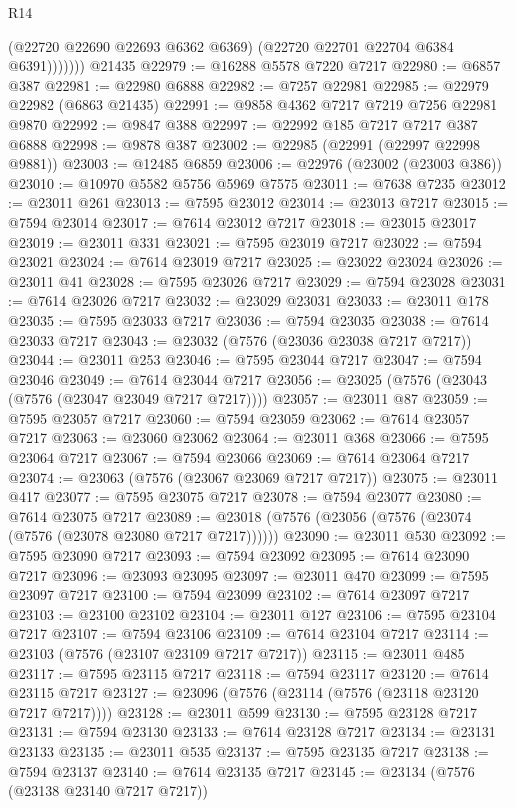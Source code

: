 \begin{lexlean}{R14}
\begin{coremodule}
                (@22720 @22690 @22693 @6362 @6369)
                (@22720 @22701 @22704 @6384 @6391)))))))
    @21435
@22979 := @16288 @5578 @7220 @7217
@22980 := @6857 @387
@22981 := @22980 @6888
@22982 := @7257 @22981
@22985 := @22979 @22982 (@6863 @21435)
@22991 := @9858 @4362 @7217 @7219 @7256 @22981 @9870
@22992 := @9847 @388
@22997 := @22992 @185 @7217 @7217 @387 @6888
@22998 := @9878 @387
@23002 := @22985 (@22991 (@22997 @22998 @9881))
@23003 := @12485 @6859
@23006 := @22976 (@23002 (@23003 @386))
@23010 := @10970 @5582 @5756 @5969 @7575
@23011 := @7638 @7235
@23012 := @23011 @261
@23013 := @7595 @23012
@23014 := @23013 @7217
@23015 := @7594 @23014
@23017 := @7614 @23012 @7217
@23018 := @23015 @23017
@23019 := @23011 @331
@23021 := @7595 @23019 @7217
@23022 := @7594 @23021
@23024 := @7614 @23019 @7217
@23025 := @23022 @23024
@23026 := @23011 @41
@23028 := @7595 @23026 @7217
@23029 := @7594 @23028
@23031 := @7614 @23026 @7217
@23032 := @23029 @23031
@23033 := @23011 @178
@23035 := @7595 @23033 @7217
@23036 := @7594 @23035
@23038 := @7614 @23033 @7217
@23043 := @23032 (@7576 (@23036 @23038 @7217 @7217))
@23044 := @23011 @253
@23046 := @7595 @23044 @7217
@23047 := @7594 @23046
@23049 := @7614 @23044 @7217
@23056 := @23025 (@7576 (@23043 (@7576 (@23047 @23049 @7217 @7217))))
@23057 := @23011 @87
@23059 := @7595 @23057 @7217
@23060 := @7594 @23059
@23062 := @7614 @23057 @7217
@23063 := @23060 @23062
@23064 := @23011 @368
@23066 := @7595 @23064 @7217
@23067 := @7594 @23066
@23069 := @7614 @23064 @7217
@23074 := @23063 (@7576 (@23067 @23069 @7217 @7217))
@23075 := @23011 @417
@23077 := @7595 @23075 @7217
@23078 := @7594 @23077
@23080 := @7614 @23075 @7217
@23089 := @23018 (@7576 (@23056 (@7576 (@23074 (@7576 (@23078 @23080 @7217 @7217))))))
@23090 := @23011 @530
@23092 := @7595 @23090 @7217
@23093 := @7594 @23092
@23095 := @7614 @23090 @7217
@23096 := @23093 @23095
@23097 := @23011 @470
@23099 := @7595 @23097 @7217
@23100 := @7594 @23099
@23102 := @7614 @23097 @7217
@23103 := @23100 @23102
@23104 := @23011 @127
@23106 := @7595 @23104 @7217
@23107 := @7594 @23106
@23109 := @7614 @23104 @7217
@23114 := @23103 (@7576 (@23107 @23109 @7217 @7217))
@23115 := @23011 @485
@23117 := @7595 @23115 @7217
@23118 := @7594 @23117
@23120 := @7614 @23115 @7217
@23127 := @23096 (@7576 (@23114 (@7576 (@23118 @23120 @7217 @7217))))
@23128 := @23011 @599
@23130 := @7595 @23128 @7217
@23131 := @7594 @23130
@23133 := @7614 @23128 @7217
@23134 := @23131 @23133
@23135 := @23011 @535
@23137 := @7595 @23135 @7217
@23138 := @7594 @23137
@23140 := @7614 @23135 @7217
@23145 := @23134 (@7576 (@23138 @23140 @7217 @7217))

\end{coremodule}
\end{lexlean}
